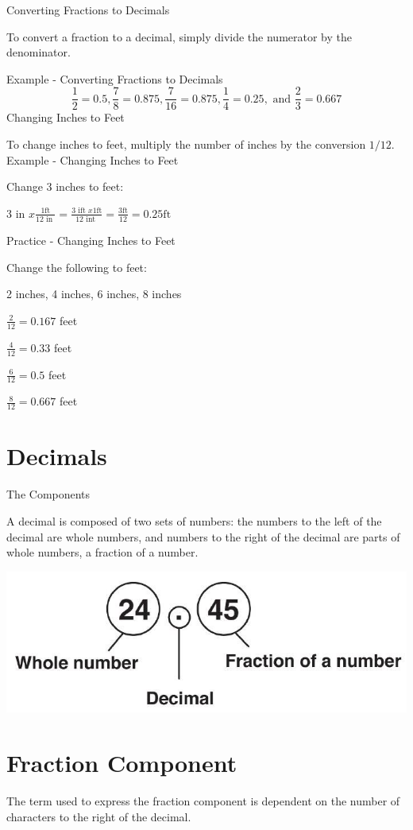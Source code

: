 \documentclass[10pt]{article}
\begin{document}
Converting Fractions to Decimals

To convert a fraction to a decimal, simply divide the numerator by the denominator.

Example - Converting Fractions to Decimals
$$
\frac{1}{2}=0.5, \frac{7}{8}=0.875, \frac{7}{16}=0.875, \frac{1}{4}=0.25, \text { and } \frac{2}{3}=0.667
$$
Changing Inches to Feet

To change inches to feet, multiply the number of inches by the conversion $1 / 12$. Example - Changing Inches to Feet

Change 3 inches to feet:

3 in $x \frac{1 \mathrm{ft}}{12 \text { in }}=\frac{3 \text { ift } x 1 \mathrm{ft}}{12 \text { int }}=\frac{3 \mathrm{ft}}{12}=0.25 \mathrm{ft}$

Practice - Changing Inches to Feet

Change the following to feet:

2 inches, 4 inches, 6 inches, 8 inches

$\frac{2}{12}=0.167$ feet

$\frac{4}{12}=0.33$ feet

$\frac{6}{12}=0.5$ feet

$\frac{8}{12}=0.667$ feet

\section{Decimals}
The Components

A decimal is composed of two sets of numbers: the numbers to the left of the decimal are whole numbers, and numbers to the right of the decimal are parts of whole numbers, a fraction of a number.

\includegraphics[max width=\textwidth]{2022_09_11_72dbedc910e6e984560cg-10}

\section{Fraction Component}
The term used to express the fraction component is dependent on the number of characters to the right of the decimal.
\end{document}
